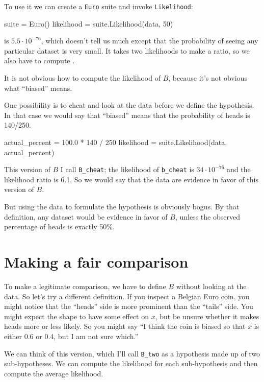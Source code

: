 \documentclass[12pt]{book}
\theoremstyle{exercise}
\newcommand{\py}[1]{{\tt #1}}%
\begin{document}
To use it we can
create a \py{Euro} suite and invoke
\py{Likelihood}:

\begin{code}
    suite = Euro()
    likelihood = suite.Likelihood(data, 50)
\end{code}

 is $5.5 \cdot 10^{-76}$, which doesn't tell us much except
that the probability of seeing any particular dataset is very small.
It takes two likelihoods to make a ratio, so we also have to
compute .

It is not obvious how to compute the likelihood of $B$, because
it's not obvious what ``biased'' means.

One possibility is to cheat and look at the data before we define
the hypothesis.  In that case we would say that ``biased'' means that
the probability of heads is 140/250.

\begin{code}
    actual_percent = 100.0 * 140 / 250
    likelihood = suite.Likelihood(data, actual_percent)
\end{code}

This version of $B$ I call \verb"B_cheat"; the likelihood of
\verb"b_cheat" is $34 \cdot 10^{-76}$ and the likelihood ratio is
6.1.  So we would say that the data are evidence in favor of this
version of $B$.

But using the data to formulate the hypothesis
is obviously bogus.  By that definition, any dataset would
be evidence in favor of $B$, unless the observed percentage of heads
is exactly 50\%.

\section{Making a fair comparison}
\label{suitelike}

To make a legitimate comparison, we have to define $B$ without looking
at the data.  So let's try a different definition.  If you inspect
a Belgian Euro coin, you might notice that the ``heads'' side is more
prominent than the ``tails'' side.  You might expect the shape to
have some effect on
$x$, but be unsure whether it makes heads more or less
likely.  So you might say ``I think the coin is biased so that
$x$ is either 0.6 or 0.4, but I am not sure which.''

We can think of this version, which I'll call \verb"B_two"
as a hypothesis made up of two
sub-hypotheses.  We can compute the likelihood for each
sub-hypothesis and then compute the average likelihood.
\end{document}
